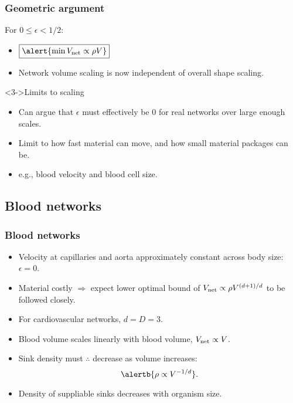 \begin{frame}
  \frametitle{Geometric argument}

  \begin{block}{For $0 \le \epsilon < 1/2$:}
    \begin{itemize}
    \item<1-> 
      $
      \boxed{\alert{
          \min V_{\textnormal{net}} 
          \propto
          \rho V
        }}
      $
    \item<2-> 
      Network volume scaling is now independent 
      of overall shape scaling.
    \end{itemize}
  \end{block}

  \medskip

  \begin{block}<3->{Limits to scaling}
    \begin{itemize}
    \item 
      Can argue that $\epsilon$ must effectively be 0
      for real networks over large enough scales.
    \item 
      Limit to how fast material can move,
      and how small material packages can be.
    \item 
      e.g., blood velocity and blood cell size.
    \end{itemize}
  \end{block}
\end{frame}


\subsection{Blood networks}

\begin{frame}
  \frametitle{Blood networks}

  \begin{itemize}
  \item<1-> Velocity at capillaries and 
    aorta approximately constant across body size\cite{weinstein2006a}: 
    $\epsilon = 0$.
  \item<2-> \alert{Material costly} $\Rightarrow$ expect lower optimal bound of 
    $V_{\textnormal{net}} \propto \rho V^{(d+1)/d}$ to be followed closely.
  \item<3->
    For cardiovascular networks, \alert{$d=D=3$}.
  \item<4->
    Blood volume scales linearly with blood 
    volume\cite{stahl1967a}, $V_{\textnormal{net}} \propto V$.
  \item<5->
    Sink density must $\therefore$ decrease as volume increases:
    $$
    \alertb{\rho \propto V^{-1/d}}.
    $$
  \item<6->
    Density of suppliable sinks \alert{decreases} with organism size.
  \end{itemize}      

\end{frame}


